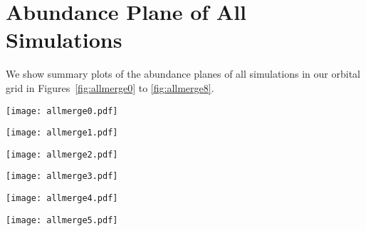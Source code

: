 \documentclass[twocolumn,linenumbers,trackchanges]{aastex631}
\newcommand{\FeH}{\ensuremath{[\textrm{Fe}/\textrm{H}]}}
\newcommand{\MgFe}{\ensuremath{[\textrm{Mg}/\textrm{Fe}]}}
\begin{document}
{}


\appendix
\section{Abundance Plane of All Simulations}\label{app:allmerge}
We show summary plots of the abundance planes of all simulations in our orbital grid in Figures~\ref{fig:allmerge0} to \ref{fig:allmerge8}.

\begin{figure*}
  \centering
  \texttt{[image: allmerge0.pdf]}
  \caption{A summary of the abundance plane and star formation history of all simulations within the orbital grid. Each figure shows the outcome of a simulation at a fixed $R_0$ and $V_0$, varying $\eta$. The title of each column shows the $R_0$, $V_0$, and $\eta$ of that simulation, in order. The upper and middle rows replicate Figure~\ref{fig:fig1}, which show the distribution of stars in the abundance plane of \MgFe{}-\FeH{} as well as 1D histograms at a fixed \FeH{} of $-0.5$, $-0.25$, $0$, and $0.25$. The lower rows replicate Figure~\ref{fig:before_after_sfh_by_iron}, showing the star formation history at each \FeH{}.}
  \label{fig:allmerge0}
\end{figure*}

\begin{figure*}
  \centering
  \texttt{[image: allmerge1.pdf]}
  \caption{A continuation of Figure~\ref{fig:allmerge0}.}
  \label{fig:allmerge1}
\end{figure*}

\begin{figure*}
  \centering
  \texttt{[image: allmerge2.pdf]}
  \caption{A continuation of Figure~\ref{fig:allmerge0}.}
  \label{fig:allmerge2}
\end{figure*}

\begin{figure*}
  \centering
  \texttt{[image: allmerge3.pdf]}
  \caption{A continuation of Figure~\ref{fig:allmerge0}.}
  \label{fig:allmerge3}
\end{figure*}

\begin{figure*}
  \centering
  \texttt{[image: allmerge4.pdf]}
  \caption{A continuation of Figure~\ref{fig:allmerge0}.}
  \label{fig:allmerge4}
\end{figure*}

\begin{figure*}
  \centering
  \texttt{[image: allmerge5.pdf]}
  \caption{A continuation of Figure~\ref{fig:allmerge0}.}
  \label{fig:allmerge5}
\end{figure*}
\end{document}

